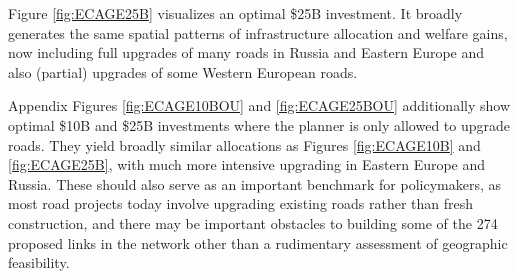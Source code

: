 \documentclass[a4paper]{article}
\begin{document}
Figure \ref{fig:ECAGE25B} visualizes an optimal \$25B investment. It broadly generates the same spatial patterns of infrastructure allocation and welfare gains, now including full upgrades of many roads in Russia and Eastern Europe and also (partial) upgrades of some Western European roads. \newline 

Appendix Figures \ref{fig:ECAGE10BOU} and \ref{fig:ECAGE25BOU} additionally show optimal \$10B and \$25B investments where the planner is only allowed to upgrade roads. They yield broadly similar allocations as Figures \ref{fig:ECAGE10B} and \ref{fig:ECAGE25B}, with much more intensive upgrading in Eastern Europe and Russia. These should also serve as an important benchmark for policymakers, as most road projects today involve upgrading existing roads rather than fresh construction, and there may be important obstacles to building some of the 274 proposed links in the network other than a rudimentary assessment of geographic feasibility. 


\newpage



\appendix

\setcounter{figure}{0}
\renewcommand{\thefigure}{A\arabic{figure}}

\end{document}
